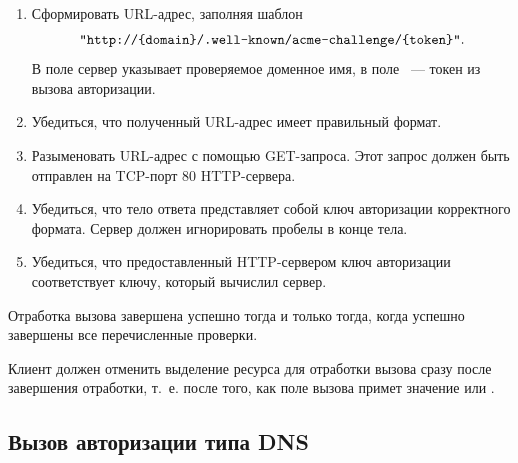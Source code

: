 \begin{enumerate}
\item     
Сформировать URL-адрес, заполняя шаблон
$$ 
\texttt{"http://\{domain\}/.well-known/acme-challenge/\{token\}"}.
$$
В поле  сервер указывает проверяемое доменное имя,
в поле ~--- токен из вызова авторизации.
\item
Убедиться, что полученный URL-адрес имеет правильный формат.
\item
Разыменовать URL-адрес с помощью GET-запроса. Этот запрос должен быть 
отправлен на TCP-порт 80 HTTP-сервера.
% 
%
\item
Убедиться, что тело ответа представляет собой ключ авторизации корректного 
формата. Сервер должен игнорировать пробелы в конце тела. 
\item
Убедиться, что предоставленный HTTP-сервером ключ авторизации соответствует 
ключу, который вычислил сервер.
\end{enumerate}


Отработка вызова завершена успешно тогда и только тогда, когда успешно 
завершены все перечисленные проверки.

Клиент должен отменить выделение ресурса для отработки вызова сразу после 
завершения отработки, т.~е. после того, как поле  вызова примет 
значение  или .


\subsection{Вызов авторизации типа DNS}\label{ACME.Chall.DNS}

